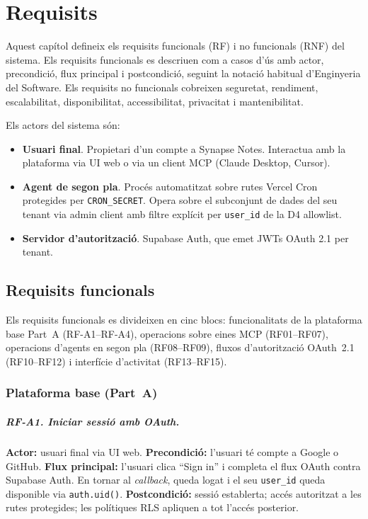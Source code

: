 \chapter{Requisits}
\label{ch:requisits}

Aquest capítol defineix els requisits funcionals (RF) i no funcionals
(RNF) del sistema. Els requisits funcionals es descriuen com a casos
d'ús amb actor, precondició, flux principal i postcondició, seguint la
notació habitual d'Enginyeria del Software. Els requisits no funcionals
cobreixen seguretat, rendiment, escalabilitat, disponibilitat,
accessibilitat, privacitat i mantenibilitat.

Els actors del sistema són:

\begin{itemize}
  \item \textbf{Usuari final}. Propietari d'un compte a Synapse Notes.
    Interactua amb la plataforma via UI web o via un client MCP
    (Claude Desktop, Cursor).
  \item \textbf{Agent de segon pla}. Procés automatitzat sobre rutes
    Vercel Cron protegides per \texttt{CRON\_SECRET}. Opera sobre el
    subconjunt de dades del seu tenant via admin client amb filtre
    explícit per \texttt{user\_id} de la D4 allowlist.
  \item \textbf{Servidor d'autorització}. Supabase Auth, que emet JWTs
    OAuth 2.1 per tenant.
\end{itemize}

\section{Requisits funcionals}
\label{sec:rf}

Els requisits funcionals es divideixen en cinc blocs: funcionalitats de la
plataforma base Part~A (RF-A1--RF-A4), operacions sobre eines MCP
(RF01--RF07), operacions d'agents en segon pla (RF08--RF09), fluxos
d'autorització OAuth~2.1 (RF10--RF12) i interfície d'activitat
(RF13--RF15).

\subsection{Plataforma base (Part~A)}

\paragraph{RF-A1. Iniciar sessió amb OAuth.}
\textbf{Actor:} usuari final via UI web.
\textbf{Precondició:} l'usuari té compte a Google o GitHub.
\textbf{Flux principal:} l'usuari clica ``Sign in'' i completa el flux
OAuth contra Supabase Auth. En tornar al \emph{callback}, queda logat i
el seu \texttt{user\_id} queda disponible via \texttt{auth.uid()}.
\textbf{Postcondició:} sessió establerta; accés autoritzat a les
rutes protegides; les polítiques RLS apliquen a tot l'accés posterior.


